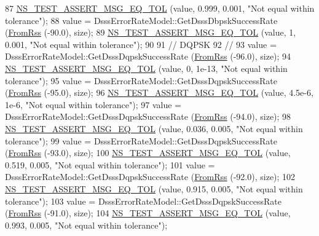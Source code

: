 \begin{DoxyCode}
87   \hyperlink{group__testing_ga9e7861b56b4e70db3b56044cb7a28e41}{NS\_TEST\_ASSERT\_MSG\_EQ\_TOL} (value, 0.999, 0.001, \textcolor{stringliteral}{"Not equal within tolerance"});
88   value = DsssErrorRateModel::GetDsssDbpskSuccessRate (\hyperlink{wifi-error-rate-models-test_8cc_a04e29db50fb1c1d787cf553ee9453e90}{FromRss} (-90.0), size);
89   \hyperlink{group__testing_ga9e7861b56b4e70db3b56044cb7a28e41}{NS\_TEST\_ASSERT\_MSG\_EQ\_TOL} (value, 1, 0.001, \textcolor{stringliteral}{"Not equal within tolerance"});
90 
91   \textcolor{comment}{// DQPSK}
92   \textcolor{comment}{//}
93   value = DsssErrorRateModel::GetDsssDqpskSuccessRate (\hyperlink{wifi-error-rate-models-test_8cc_a04e29db50fb1c1d787cf553ee9453e90}{FromRss} (-96.0), size);
94   \hyperlink{group__testing_ga9e7861b56b4e70db3b56044cb7a28e41}{NS\_TEST\_ASSERT\_MSG\_EQ\_TOL} (value, 0, 1e-13, \textcolor{stringliteral}{"Not equal within tolerance"});
95   value = DsssErrorRateModel::GetDsssDqpskSuccessRate (\hyperlink{wifi-error-rate-models-test_8cc_a04e29db50fb1c1d787cf553ee9453e90}{FromRss} (-95.0), size);
96   \hyperlink{group__testing_ga9e7861b56b4e70db3b56044cb7a28e41}{NS\_TEST\_ASSERT\_MSG\_EQ\_TOL} (value, 4.5e-6, 1e-6, \textcolor{stringliteral}{"Not equal within tolerance"});
97   value = DsssErrorRateModel::GetDsssDqpskSuccessRate (\hyperlink{wifi-error-rate-models-test_8cc_a04e29db50fb1c1d787cf553ee9453e90}{FromRss} (-94.0), size);
98   \hyperlink{group__testing_ga9e7861b56b4e70db3b56044cb7a28e41}{NS\_TEST\_ASSERT\_MSG\_EQ\_TOL} (value, 0.036, 0.005, \textcolor{stringliteral}{"Not equal within tolerance"});
99   value = DsssErrorRateModel::GetDsssDqpskSuccessRate (\hyperlink{wifi-error-rate-models-test_8cc_a04e29db50fb1c1d787cf553ee9453e90}{FromRss} (-93.0), size);
100   \hyperlink{group__testing_ga9e7861b56b4e70db3b56044cb7a28e41}{NS\_TEST\_ASSERT\_MSG\_EQ\_TOL} (value, 0.519, 0.005, \textcolor{stringliteral}{"Not equal within tolerance"});
101   value = DsssErrorRateModel::GetDsssDqpskSuccessRate (\hyperlink{wifi-error-rate-models-test_8cc_a04e29db50fb1c1d787cf553ee9453e90}{FromRss} (-92.0), size);
102   \hyperlink{group__testing_ga9e7861b56b4e70db3b56044cb7a28e41}{NS\_TEST\_ASSERT\_MSG\_EQ\_TOL} (value, 0.915, 0.005, \textcolor{stringliteral}{"Not equal within tolerance"});
103   value = DsssErrorRateModel::GetDsssDqpskSuccessRate (\hyperlink{wifi-error-rate-models-test_8cc_a04e29db50fb1c1d787cf553ee9453e90}{FromRss} (-91.0), size);
104   \hyperlink{group__testing_ga9e7861b56b4e70db3b56044cb7a28e41}{NS\_TEST\_ASSERT\_MSG\_EQ\_TOL} (value, 0.993, 0.005, \textcolor{stringliteral}{"Not equal within tolerance"});

\end{DoxyCode}

